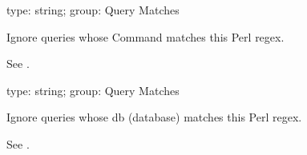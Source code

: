 \documentclass[letterpaper,10pt,english]{sphinxmanual}
\begin{document}
\begin{fulllineitems}
\label{\detokenize{mariadb-kill:cmdoption-mariadb-kill-ignore-command}}
\sphinxAtStartPar
type: string; group: Query Matches

\sphinxAtStartPar
Ignore queries whose Command matches this Perl regex.

\sphinxAtStartPar
See {\hyperref[\detokenize{mariadb-kill:cmdoption-mariadb-kill-match-command}]{}}.

\end{fulllineitems}


\begin{fulllineitems}
\label{\detokenize{mariadb-kill:cmdoption-mariadb-kill-ignore-db}}
\sphinxAtStartPar
type: string; group: Query Matches

\sphinxAtStartPar
Ignore queries whose db (database) matches this Perl regex.

\sphinxAtStartPar
See {\hyperref[\detokenize{mariadb-kill:cmdoption-mariadb-kill-match-db}]{}}.

\end{fulllineitems}

\end{document}
